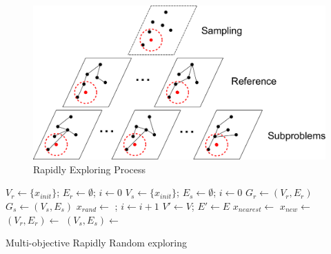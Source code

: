 \documentclass[conference]{IEEEtran}
\begin{document}

\begin{figure}[H]
\centering
\includegraphics[width=0.9\linewidth]{./fig/MORRTstar}
\caption{Rapidly Exploring Process}
\label{fig:MORRTstar}
\end{figure}

\begin{algorithm}
	\label{alg:rapidly_exploring_process}
	\begin{algorithmic}[1]
		\State $ V_{r} \leftarrow \{ x_{init} \} $; $ E_{r} \leftarrow \emptyset $; $ i \leftarrow 0 $
		\EndFor
		\State $ V_{s} \leftarrow \{ x_{init} \} $; $ E_{s} \leftarrow \emptyset $; $ i \leftarrow 0 $
		\EndFor
		\State $ G_{r} \leftarrow (V_{r}, E_{r}) $
		\EndFor
		\State $ G_{s} \leftarrow (V_{s}, E_{s}) $
		\EndFor
		\State $ x_{rand} \leftarrow $  ; $ i \leftarrow i + 1 $
		\State $ V' \leftarrow V $; $ E' \leftarrow E $
		\State $ x_{nearest} \leftarrow $ 
		\State $ x_{new} \leftarrow $ 
		\State $ (V_{r}, E_{r}) \leftarrow $ 
		\EndFor
		\State $ (V_{s}, E_{s}) \leftarrow $ 
		\EndFor
		\EndIf
		\EndWhile
	\end{algorithmic}
	\caption{Multi-objective Rapidly Random exploring }
\end{algorithm}
\end{document}
